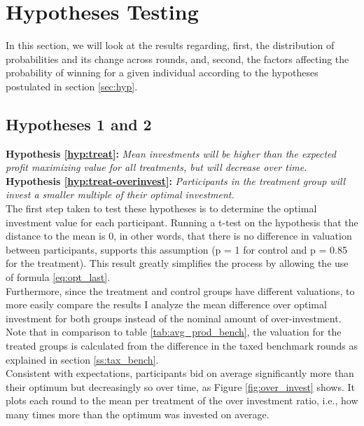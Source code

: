\section{Hypotheses Testing}

In this section, we will look at the results regarding, first, the distribution of probabilities and its change across rounds, and, second, the factors affecting the probability of winning for a given individual according to the hypotheses postulated in section \ref{sec:hyp}.


\subsection{Hypotheses 1 and 2}

\textbf{Hypothesis \ref{hyp:treat}:} \textit{Mean investments will be higher than the expected profit maximizing value for all treatments, but will decrease over time.}\\ 
\textbf{Hypothesis \ref{hyp:treat-overinvest}:} \textit{Participants in the treatment group will invest a smaller multiple of their optimal investment.}\\

The first step taken to test these hypotheses is to determine the optimal investment value for each participant. Running a t-test on the hypothesis that the distance to the mean is 0, in other words, that there is no difference in valuation between participants, supports this assumption (p = 1 for control and p = 0.85 for the treatment). This result greatly simplifies the process by allowing the use of formula \ref{eq:opt_last}.\\

Furthermore, since the treatment and control groups have different valuations, to more easily compare the results I analyze the mean difference over optimal investment for both groups instead of the nominal amount of over-investment. Note that in comparison to table \ref{tab:avg_prod_bench}, the valuation for the treated groups is calculated from the difference in the taxed benchmark rounds as explained in section \ref{ss:tax_bench}.\\

Consistent with expectations, participants bid on average significantly more than their optimum but decreasingly so over time, as Figure \ref{fig:over_invest} shows. It plots each round to the mean per treatment of the over investment ratio, i.e., how many times more than the optimum was invested on average.\\

